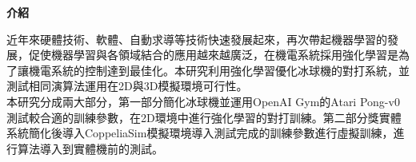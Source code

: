 \begin{flushleft}
{\large \textbf{介紹}}\\
\end{flushleft}

近年來硬體技術、軟體、自動求導等技術快速發展起來，再次帶起機器學習的發展，促使機器學習與各領域結合的應用越來越廣泛，在機電系統採用強化學習是為了讓機電系統的控制達到最佳化。本研究利用強化學習優化冰球機的對打系統，並測試相同演算法運用在2D與3D模擬環境可行性。\\

 本研究分成兩大部分，第一部分簡化冰球機並運用OpenAI Gym的Atari Pong-v0測試較合適的訓練參數，在2D環境中進行強化學習的對打訓練。第二部分獎實體系統簡化後導入CoppeliaSim模擬環境導入測試完成的訓練參數進行虛擬訓練，進行算法導入到實體機前的測試。\\

\begin{figure}[hbt!]
\begin{center}
\end{center}
\end{figure}
